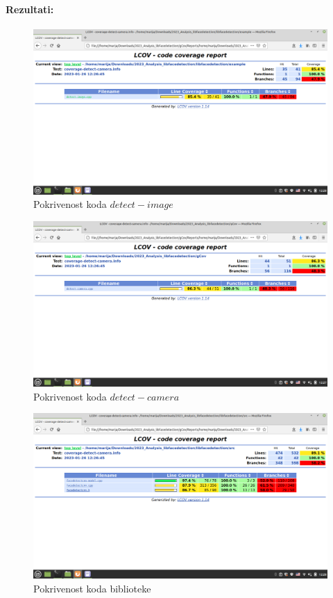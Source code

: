 \documentclass{article}
\begin{document}
\paragraph{Rezultati:}

\begin{figure}[H]
    \centering
    \includegraphics[width=12cm]{img/gcov/gcovDI.png}
    \caption{Pokrivenost koda $detect-image$}
    \label{di:gcov}
\end{figure}
\begin{figure}[H]
    \centering
    \includegraphics[width=12cm]{img/gcov/gcovDC.png}
    \caption{Pokrivenost koda $detect-camera$}
    \label{dc:gcov}
\end{figure}
\begin{figure}[H]
    \centering
    \includegraphics[width=12cm]{img/gcov/gcovSRC.png}
    \caption{Pokrivenost koda biblioteke }
    \label{src:gcov}
\end{figure}
\end{document}
